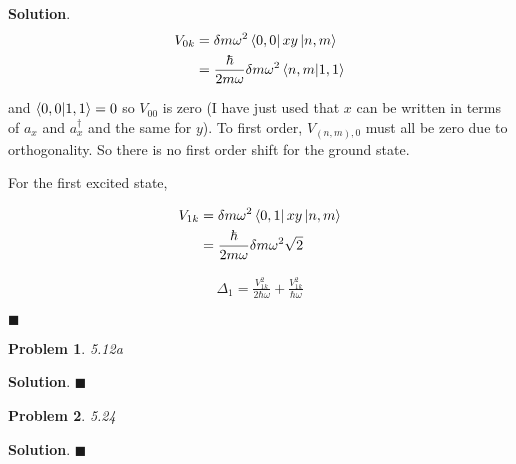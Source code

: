 \documentclass[12pt]{article}
\newtheorem{p}{Problem}
\theoremstyle{definition}
\newenvironment{s}{%
        \begin{trivlist} \item \textbf{Solution}. }{%
            \hspace*{\fill} $\blacksquare$\end{trivlist}}%
\begin{document}
{\begin{s}
\begin{align*}
V_{0k} &= \delta m\omega^{2}\bra{0,0} xy \ket{n,m}\\
&= \frac{\hbar}{2m\omega}\delta m\omega^{2}\bra{n,m}\ket{1,1}\\
\end{align*}

and $\bra{0,0}\ket{1,1} = 0$ so $V_{00}$ is zero (I have just used that $x$ can be written in terms of $a_{x}$ and $a_{x}^{\dagger}$ and the same for $y$). To first order, $V_{(n,m),0}$ must all be zero due to orthogonality. So there is no first order shift for the ground state.

\noindent For the first excited state,


\begin{align*}
V_{1k} &= \delta m\omega^{2}\bra{0,1} xy \ket{n,m}\\
&= \frac{\hbar}{2m\omega}\delta m\omega^{2}\sqrt{2}\\
\end{align*}

\begin{align*}
\Delta_{1} = \frac{V_{1k}^{2}}{2\hbar\omega} + \frac{V_{1k}^{2}}{\hbar\omega}
\end{align*}



\end{s}

\begin{p}
5.12a
\end{p}

\begin{s}
\end{s}

\begin{p}
5.24
\end{p}

\begin{s}
\end{s}
\end{document}
